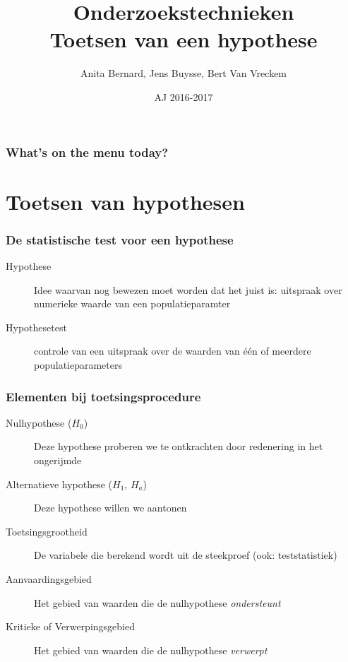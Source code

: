 \documentclass{beamer}
\title[Intro]{Onderzoekstechnieken\\Toetsen van een hypothese}
\author{Anita Bernard, Jens Buysse, Bert {Van Vreckem}}
\date{AJ 2016-2017}
\begin{document}

\HoGentLogo

\titleframe



\begin{frame}
  \frametitle{What's on the menu today?}

  \tableofcontents
\end{frame}

\section{Toetsen van hypothesen}

\sectionframelogo{}


\begin{frame}
  \frametitle{De statistische test voor een hypothese}

  \begin{description}
    \item[Hypothese] Idee waarvan nog bewezen moet worden dat het juist is: uitspraak over numerieke waarde van een populatieparamter
    \item[Hypothesetest] controle van een uitspraak over de waarden van één of meerdere populatieparameters
  \end{description}
\end{frame}

\begin{frame}
  \frametitle{Elementen bij toetsingsprocedure}

  \begin{description}
    \item[Nulhypothese ($H_0$)] Deze hypothese proberen we te ontkrachten door redenering in het ongerijmde
    \item[Alternatieve hypothese ($H_1$, $H_a$)] Deze hypothese willen we aantonen
    \item[Toetsingsgrootheid] De variabele die berekend wordt uit de steekproef (ook: teststatistiek)
    \item[Aanvaardingsgebied] Het gebied van waarden die de nulhypothese \emph{ondersteunt}
    \item[Kritieke of Verwerpingsgebied] Het gebied van waarden die de nulhypothese \emph{verwerpt}
  \end{description}
\end{frame}
\end{document}
